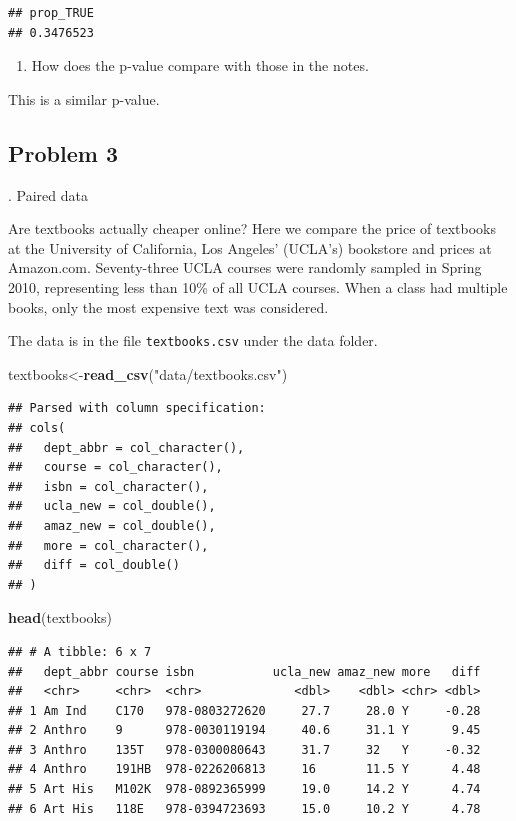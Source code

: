 \documentclass[
]{book}
\newenvironment{Shaded}{\begin{snugshade}}{\end{snugshade}}
\newcommand{\KeywordTok}[1]{\textcolor[rgb]{0.13,0.29,0.53}{\textbf{#1}}}
\newcommand{\NormalTok}[1]{#1}
\newcommand{\StringTok}[1]{\textcolor[rgb]{0.31,0.60,0.02}{#1}}
\providecommand{\tightlist}{%
  \setlength{\itemsep}{0pt}\setlength{\parskip}{0pt}}
\begin{document}
\begin{verbatim}
## prop_TRUE 
## 0.3476523
\end{verbatim}

\begin{enumerate}
\def\labelenumi{\alph{enumi}.}
\setcounter{enumi}{6}
\tightlist
\item
  How does the p-value compare with those in the notes.
\end{enumerate}

This is a similar p-value.

\hypertarget{problem-3-16}{%
\subsection{Problem 3}\label{problem-3-16}}

. Paired data

Are textbooks actually cheaper online? Here we compare the price of textbooks at the University of California, Los Angeles' (UCLA's) bookstore and prices at Amazon.com. Seventy-three UCLA courses were randomly sampled in Spring 2010, representing less than 10\% of all UCLA courses. When a class had multiple books, only the most expensive text was considered.

The data is in the file \texttt{textbooks.csv} under the data folder.

\begin{Shaded}
\begin{Highlighting}[]
\NormalTok{textbooks<-}\KeywordTok{read_csv}\NormalTok{(}\StringTok{"data/textbooks.csv"}\NormalTok{)}
\end{Highlighting}
\end{Shaded}

\begin{verbatim}
## Parsed with column specification:
## cols(
##   dept_abbr = col_character(),
##   course = col_character(),
##   isbn = col_character(),
##   ucla_new = col_double(),
##   amaz_new = col_double(),
##   more = col_character(),
##   diff = col_double()
## )
\end{verbatim}

\begin{Shaded}
\begin{Highlighting}[]
\KeywordTok{head}\NormalTok{(textbooks)}
\end{Highlighting}
\end{Shaded}

\begin{verbatim}
## # A tibble: 6 x 7
##   dept_abbr course isbn           ucla_new amaz_new more   diff
##   <chr>     <chr>  <chr>             <dbl>    <dbl> <chr> <dbl>
## 1 Am Ind    C170   978-0803272620     27.7     28.0 Y     -0.28
## 2 Anthro    9      978-0030119194     40.6     31.1 Y      9.45
## 3 Anthro    135T   978-0300080643     31.7     32   Y     -0.32
## 4 Anthro    191HB  978-0226206813     16       11.5 Y      4.48
## 5 Art His   M102K  978-0892365999     19.0     14.2 Y      4.74
## 6 Art His   118E   978-0394723693     15.0     10.2 Y      4.78
\end{verbatim}
\end{document}
